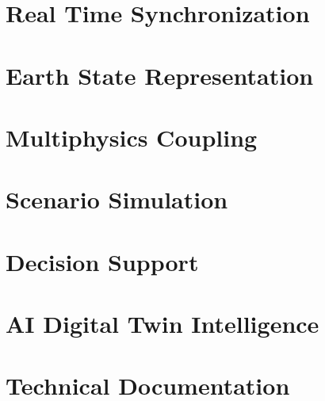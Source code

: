 \documentclass[11pt,a4paper,oneside]{report}
\begin{document}
\chapter{Real Time Synchronization}



\chapter{Earth State Representation}



\chapter{Multiphysics Coupling}



\chapter{Scenario Simulation}



\chapter{Decision Support}



\chapter{AI Digital Twin Intelligence}



\appendix


\chapter{Technical Documentation}






\printbibliography



\end{document}
